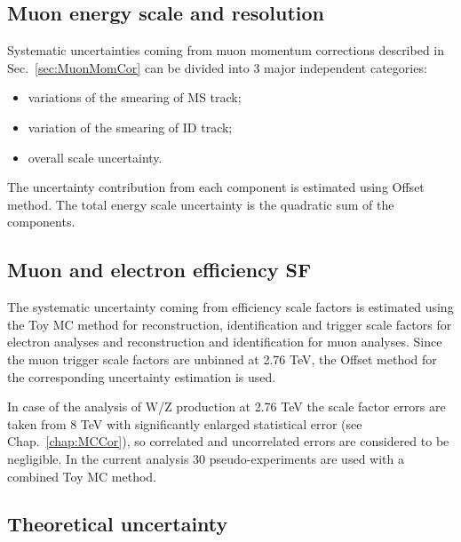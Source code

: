 \subsection{Muon energy scale and resolution}
Systematic uncertainties coming from muon momentum corrections described in Sec.~\ref{sec:MuonMomCor} can be divided into 3 major independent categories:
\begin{itemize}
\item variations of the smearing of MS track;
\item variation of the smearing of ID track;
\item overall scale uncertainty.
\end{itemize}
The uncertainty contribution from each component is estimated using Offset method. The total energy scale uncertainty is the quadratic sum of the components.

\subsection{Muon and electron efficiency SF}
The systematic uncertainty coming from efficiency scale factors is estimated using the Toy MC method for reconstruction, identification and trigger scale factors for electron analyses and reconstruction and identification for muon analyses. Since the muon trigger scale factors are unbinned at 2.76 TeV, the Offset method for the corresponding uncertainty estimation is used.

 In case of the analysis of W/Z production at 2.76 TeV the scale factor errors are taken from 8 TeV with significantly enlarged statistical error (see Chap.~\ref{chap:MCCor}), so correlated and uncorrelated errors are considered to be negligible. In the current analysis 30 pseudo-experiments are used with a combined Toy MC method. 
 
 \subsection{Theoretical uncertainty}\label{sec:TheoCw}
 
